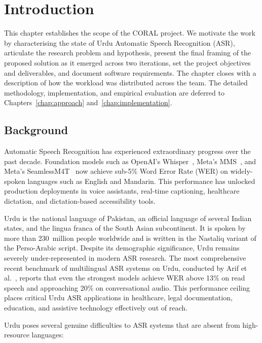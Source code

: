\chapter{Introduction}
\label{chap:introduction}

This chapter establishes the scope of the CORAL project. We motivate the work by characterising the state of Urdu Automatic Speech Recognition (ASR), articulate the research problem and hypothesis, present the final framing of the proposed solution as it emerged across two iterations, set the project objectives and deliverables, and document software requirements. The chapter closes with a description of how the workload was distributed across the team. The detailed methodology, implementation, and empirical evaluation are deferred to Chapters~\ref{chap:approach} and~\ref{chap:implementation}.

\section{Background}
\label{sec:background}

Automatic Speech Recognition has experienced extraordinary progress over the past decade. Foundation models such as OpenAI's Whisper~\cite{radford2022whisper}, Meta's MMS~\cite{pratap2023mms}, and Meta's SeamlessM4T~\cite{seamlessm4t2023} now achieve sub-5\% Word Error Rate (WER) on widely-spoken languages such as English and Mandarin. This performance has unlocked production deployments in voice assistants, real-time captioning, healthcare dictation, and dictation-based accessibility tools.

Urdu is the national language of Pakistan, an official language of several Indian states, and the lingua franca of the South Asian subcontinent. It is spoken by more than 230~million people worldwide and is written in the Nastaliq variant of the Perso-Arabic script. Despite its demographic significance, Urdu remains severely under-represented in modern ASR research. The most comprehensive recent benchmark of multilingual ASR systems on Urdu, conducted by Arif et al.~\cite{arif2024wer}, reports that even the strongest models achieve WER above 13\% on read speech and approaching 20\% on conversational audio. This performance ceiling places critical Urdu ASR applications in healthcare, legal documentation, education, and assistive technology effectively out of reach.

Urdu poses several genuine difficulties to ASR systems that are absent from high-resource languages:

